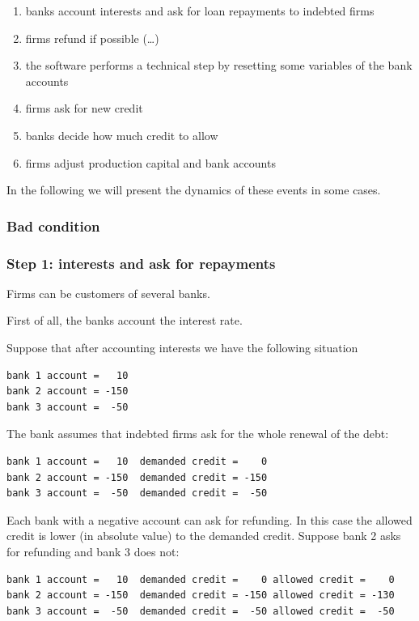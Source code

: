 \documentclass{article}
\begin{document}
\begin{enumerate}
	\item banks account interests and ask for loan repayments to indebted firms
	\item firms refund if possible (\dots)
	\item the software performs a technical step by resetting some variables of the bank accounts
	\item firms ask for new credit
	\item banks decide how much credit to allow
	\item firms adjust production capital and bank accounts
\end{enumerate}
In the following we will present the dynamics of these events in some cases.

\subsubsection{Bad condition}
\subsubsection*{Step 1: interests and ask for repayments}
Firms can be customers of several banks.

First of all, the banks account the interest rate.

Suppose that after accounting interests we have the following situation
\begin{verbatim}
bank 1 account =   10
bank 2 account = -150
bank 3 account =  -50
\end{verbatim}

The bank assumes that indebted firms ask for the whole renewal of the debt:

\begin{verbatim}
bank 1 account =   10  demanded credit =    0
bank 2 account = -150  demanded credit = -150
bank 3 account =  -50  demanded credit =  -50
\end{verbatim}

Each bank with a negative account can ask for refunding. In this case the allowed credit is lower (in absolute value) to the demanded credit.
Suppose bank 2 asks for refunding and bank 3 does not:

\begin{verbatim}
bank 1 account =   10  demanded credit =    0 allowed credit =    0
bank 2 account = -150  demanded credit = -150 allowed credit = -130 
bank 3 account =  -50  demanded credit =  -50 allowed credit =  -50
\end{verbatim}
\end{document}
